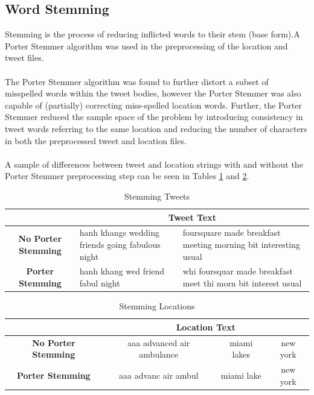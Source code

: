 \documentclass[11pt,a4paper]{article}
\begin{document}
\subsection{Word Stemming}

Stemming is the process of reducing inflicted words to their stem (base form).A Porter Stemmer algorithm was used in the preprocessing of the location and tweet files. \\\\
The Porter Stemmer algorithm was found to further distort a subset of misspelled words within the tweet bodies, however the Porter Stemmer was also capable of (partially) correcting miss-spelled location words. Further, the Porter Stemmer reduced the sample space of the problem by introducing consistency in tweet words referring to the same location and reducing the number of characters in both the preprocessed tweet and location files.\\\\
A sample of differences between tweet and location strings with and without the Porter Stemmer preprocessing step can be seen in Tables \ref{table:stem-tweet} and \ref{table:stem-location}.
   
\begin{table} [h]
\caption{Stemming Tweets}
\begin{center}
	\begin{tabular}{| c | p{5.5cm} | p{5.5cm} |}
	\hline
	  & \multicolumn{2}{|c|}{\textbf{Tweet Text}}\\
	\hline
	\textbf{No Porter Stemming} &  hanh khangs wedding friends going fabulous night & foursquare made breakfast meeting morning bit interesting usual\\
	\hline
	\textbf{Porter Stemming}  & hanh khang wed friend fabul night & whi foursquar made breakfast meet thi morn bit interest usual\\
	\hline
	\end{tabular}
\end{center}
\label{table:stem-tweet}
\end{table}

\begin{table} [h]
\caption{Stemming Locations}
\begin{center}
	\begin{tabular}{| c | c | c | c | }
	\hline
	 &  \multicolumn{3}{|c|}{\textbf{Location Text}}\\
	\hline
	\textbf{No Porter Stemming} & aaa advanced air ambulance
& miami lakes & new york\\
	\hline
	\textbf{Porter Stemming} &  aaa advanc air ambul
& miami lake & new york\\
	\hline
	\end{tabular}
\end{center}
\label{table:stem-location}
\end{table}
\end{document}
